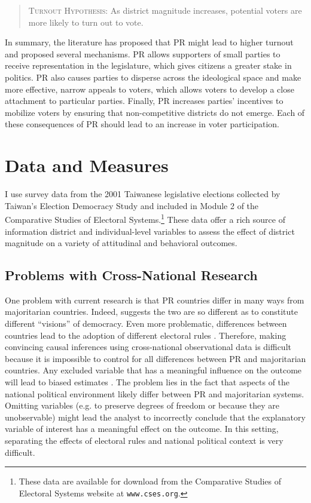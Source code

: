 \documentclass[12pt]{article}
\begin{document}
\begin{quote}
\textsc{Turnout Hypothesis:} As district magnitude increases, potential voters are more likely to turn out to vote.
\end{quote}

In summary, the literature has proposed that PR might lead to higher turnout and proposed several mechanisms. PR allows supporters of small parties to receive representation in the legislature, which gives citizens a greater stake in politics. PR also causes parties to disperse across the ideological space and make more effective, narrow appeals to voters, which allows voters to develop a close attachment to particular parties. Finally, PR increases parties' incentives to mobilize voters by ensuring that non-competitive districts do not emerge. Each of these consequences of PR should lead to an increase in voter participation.

\section*{Data and Measures}

I use survey data from the 2001 Taiwanese legislative elections collected by Taiwan's Election Democracy Study and included in Module 2 of the Comparative Studies of Electoral Systems.\footnote{These data are available for download from the Comparative Studies of Electoral Systems website at \texttt{www.cses.org}.}
These data offer a rich source of information district and individual-level variables to assess the effect of district magnitude on a variety of attitudinal and behavioral outcomes. 

\subsection*{Problems with Cross-National Research}

One problem with current research is that PR countries differ in many ways from majoritarian countries. Indeed, \cite{Powell2000} suggests the two are so different as to constitute different ``visions'' of democracy. Even more problematic, differences between countries lead to the adoption of different electoral rules \citep{BlaisDobrzynskaIndridason, Boix1999}. Therefore, making convincing causal inferences using cross-national observational data is difficult because it is impossible to control for all differences between PR and majoritarian countries. Any excluded variable that has a meaningful influence on the outcome will lead to biased estimates \citep{Greene2008}. The problem lies in the fact that aspects of the national political environment likely differ between PR and majoritarian systems. Omitting variables (e.g. to preserve degrees of freedom or because they are unobservable) might lead the analyst to incorrectly conclude that the explanatory variable of interest has a meaningful effect on the outcome. In this setting, separating the effects of electoral rules and national political context is very difficult.
\end{document}
